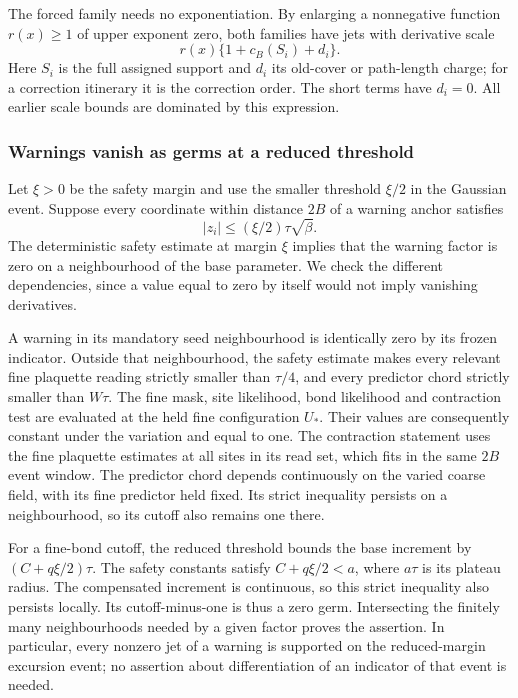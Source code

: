 The forced family needs no exponentiation. By enlarging a
nonnegative function $r(x)\ge1$ of upper exponent zero, both
families have jets with derivative scale
\begin{equation}\label{eq:activity-common-scale}
 r(x)\{1+c_B(S_i)+d_i\}.
\end{equation}
Here $S_i$ is the full assigned support and $d_i$ its old-cover
or path-length charge; for a correction itinerary it is the
correction order. The short terms have $d_i=0$. All earlier
scale bounds are dominated by this expression.

\subsubsection{Warnings vanish as germs at a reduced threshold}
Let $\xi>0$ be the safety margin and use the smaller threshold
$\xi/2$ in the Gaussian event. Suppose every coordinate within
distance $2B$ of a warning anchor satisfies
\[
 |z_i|\le(\xi/2)\tau\sqrt\beta.
\]
The deterministic safety estimate at margin $\xi$ implies that
the warning factor is zero on a neighbourhood of the base
parameter. We check the different dependencies, since a value
equal to zero by itself would not imply vanishing derivatives.

A warning in its mandatory seed neighbourhood is identically
zero by its frozen indicator. Outside that neighbourhood, the
safety estimate makes every relevant fine plaquette reading
strictly smaller than $\tau/4$, and every predictor chord
strictly smaller than $W\tau$. The fine mask, site likelihood,
bond likelihood and contraction test are evaluated at the held
fine configuration $U_*$. Their values are consequently constant
under the variation and equal to one. The contraction statement
uses the fine plaquette estimates at all sites in its read set,
which fits in the same $2B$ event window. The predictor chord
depends continuously on the varied coarse field, with its fine
predictor held fixed. Its strict inequality persists on a
neighbourhood, so its cutoff also remains one there.

For a fine-bond cutoff, the reduced threshold bounds the base
increment by $(C+q\xi/2)\tau$. The safety constants satisfy
$C+q\xi/2<a$, where $a\tau$ is its plateau radius.
The compensated increment is continuous, so this strict
inequality also persists locally. Its cutoff-minus-one is thus
a zero germ. Intersecting the finitely many neighbourhoods
needed by a given factor proves the assertion. In particular,
every nonzero jet of a warning is supported on the reduced-margin
excursion event; no assertion about differentiation of an
indicator of that event is needed.

